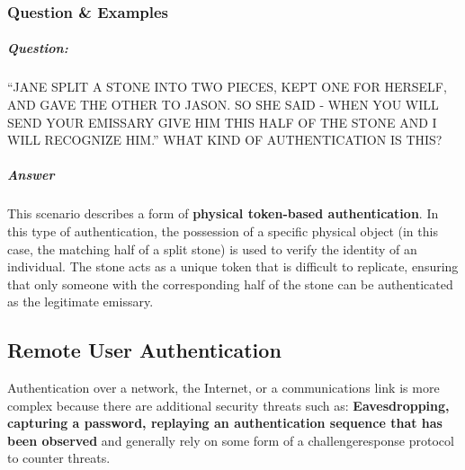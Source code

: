 \documentclass{article}
\begin{document}
            \subsubsection{Question \& Examples}
                \subparagraph{Question:}
                “JANE SPLIT A STONE INTO TWO PIECES, KEPT ONE FOR
                HERSELF, AND GAVE THE OTHER TO JASON. SO SHE SAID -
                WHEN YOU WILL SEND YOUR EMISSARY GIVE HIM THIS HALF
                OF THE STONE AND I WILL RECOGNIZE HIM.”
                WHAT KIND OF AUTHENTICATION IS THIS?
                \subparagraph{Answer}
                This scenario describes a form of \textbf{physical token-based authentication}. In this type of authentication, the possession of a specific physical object (in this case, the matching half of a split stone) is used to verify the identity of an individual. The stone acts as a unique token that is difficult to replicate, ensuring that only someone with the corresponding half of the stone can be authenticated as the legitimate emissary.
            \newpage
            \newpage
                \subsection{Remote User Authentication}
        Authentication over a network, the Internet, or
        a communications link is more complex because there are additional security threats such as:
        \textbf{Eavesdropping, capturing a password, replaying an
        authentication sequence that has been observed} and generally rely on some form of a challengeresponse
        protocol to counter threats. 
        \newpage
\end{document}
